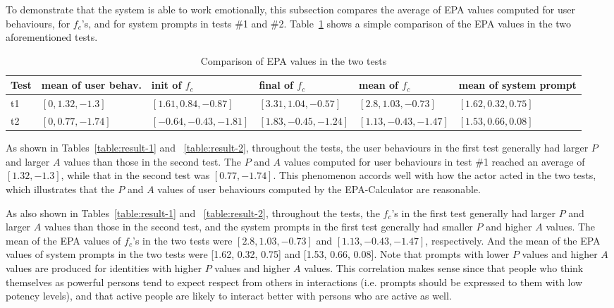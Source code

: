 To demonstrate that the system is able to work emotionally, this subsection compares the average of EPA values computed for user behaviours, for $f_c$'s, and for system prompts in tests \#1 and \#2. Table~\ref{table:compare-epa-the-two} shows a simple comparison of the EPA values in the two aforementioned tests. 

%
\begin{table}\footnotesize
\centering
\caption{Comparison of EPA values in the two tests}
\label{table:compare-epa-the-two}
\begin{tabular}{|  p{0.5cm} | p{2.1cm} |  p{3.1cm} |  p{2.9cm} |  p{2.9cm} | p{2.3cm} |}
\hline
Test & mean of user behav. & init of $f_c$ & final of $f_c$ & mean of $f_c$ & mean of system prompt \\ \hline
t1 & $[0,1.32,-1.3]$ & $[1.61,0.84,-0.87]$ & $[3.31,1.04,-0.57]$ & $[2.8,1.03,-0.73]$ & $[1.62,0.32,0.75]$ \\ \hline
t2 & $[0,0.77,-1.74]$ & $[-0.64,-0.43,-1.81]$ & $[1.83,-0.45,-1.24]$ & $[1.13,-0.43,-1.47]$ & $[1.53,0.66,0.08]$ \\ \hline
\end{tabular}
\end{table}

As shown in Tables~\ref{table:result-1} and ~\ref{table:result-2}, throughout the tests, the user behaviours in the first test generally had larger $P$ and larger $A$ values than those in the second test. The $P$ and $A$ values computed for user behaviours in test \#1 reached an average of $[1.32, -1.3]$, while that in the second test was $[0.77, -1.74]$. This phenomenon accords well with how the actor acted in the two tests, which illustrates that the $P$ and $A$ values of user behaviours computed by the EPA-Calculator are reasonable.

As also shown in Tables~\ref{table:result-1} and ~\ref{table:result-2}, throughout the tests, the $f_c$'s in the first test generally had larger $P$ and larger $A$ values than those in the second test, and the system prompts in the first test generally had smaller $P$ and higher $A$ values. The mean of the EPA values of $f_c$'s in the two tests were $[2.8, 1.03, -0.73]$ and $[1.13, -0.43, -1.47]$, respectively. And the mean of the EPA values of system prompts in the two tests were [1.62, 0.32, 0.75] and [1.53, 0.66, 0.08]. Note that prompts with lower $P$ values and higher $A$ values are produced for identities with higher $P$ values and higher $A$ values. This correlation makes sense since that people who think themselves as powerful persons tend to expect respect from others in interactions (i.e. prompts should be expressed to them with low potency levels), and that active people are likely to interact better with persons who are active as well. 

